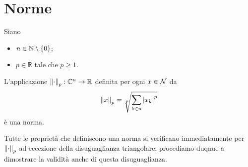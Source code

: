 \section{Norme}
\label{SpaziVettorialiComplessi_Norme}
\begin{Theorem}
  Siano
  \begin{itemize}
    \item $n \in \mathbb{N} \setminus \lbrace 0 \rbrace$;
    \item $p \in \mathbb{R}$ tale che $p \geq 1$.
  \end{itemize}
  L'applicazione $\Norm{\cdot}[p]: \mathbb{C}^n \rightarrow \mathbb{R}$
  definita per ogni $x \in \mathcal{N}$ da
  \[
    \Norm{x}[p] = \sqrt[p]{\sum_{k \in n} \AbsoluteValue{x_k}^p}
  \]
  \`e una norma.
\end{Theorem}
\Proof Tutte le propriet\`a che definiscono una norma si verificano
immediatamente per $\Norm{\cdot}[p]$ ad eccezione della disuguaglianza
triangolare: procediamo duqnue a dimostrare la validit\`a anche di questa
disuguaglianza.
\par 


